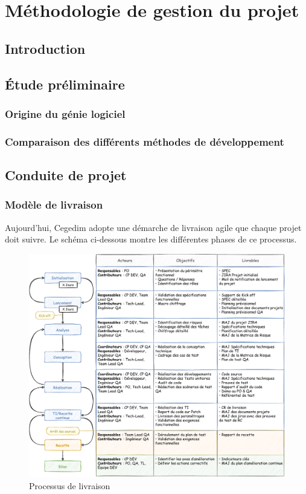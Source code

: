 \section{Méthodologie de gestion du projet}
\subsection{Introduction}
\subsection{Étude préliminaire}
\subsubsection{Origine du génie logiciel}
\subsubsection{Comparaison des différents méthodes de développement}
\subsection{Conduite de projet}
\subsubsection{Modèle de livraison}
Aujourd'hui, Cegedim adopte une démarche de livraison agile que chaque projet doit suivre. Le schéma ci-dessous montre les différentes phases de ce processus.
\begin{figure}[H]
    \begin{center}
        \includegraphics[width=\linewidth]{images/sec3/deliveryprocess.pdf}
        \caption{Processus de livraison }
    \end{center}
\end{figure}
